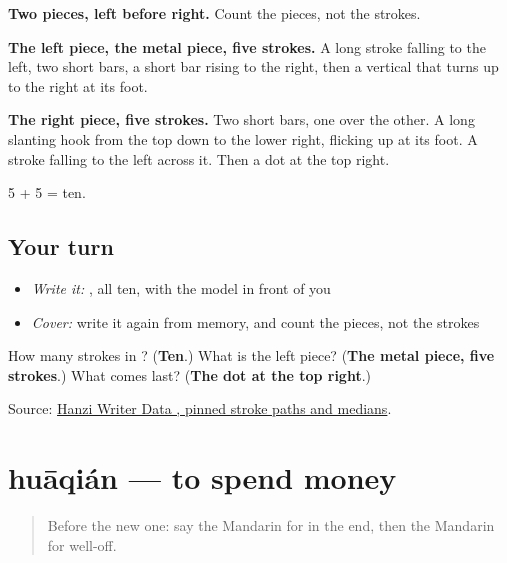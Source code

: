 \begin{quote}
\end{quote}

\textbf{Two pieces, left before right.} Count the pieces, not the strokes.

\textbf{The left piece, the metal piece, five strokes.} A long stroke falling to the left, two short bars, a short bar rising to the right, then a vertical that turns up to the right at its foot.

\textbf{The right piece, five strokes.} Two short bars, one over the other. A long slanting hook from the top down to the lower right, flicking up at its foot. A stroke falling to the left across it. Then a dot at the top right.

5 + 5 = ten.

\subsection*{Your turn}
\begin{itemize}
\raggedright
  \item \emph{Write it:} , all ten, with the model in front of you
  \item \emph{Cover:} write it again from memory, and count the pieces, not the strokes
\end{itemize}

\begin{tcolorbox}[breakable,colback=teal!4,colframe=teal!35!black,title={Before you move on}]
How many strokes in ? (\textbf{Ten}.) What is the left piece? (\textbf{The metal piece, five strokes}.) What comes last? (\textbf{The dot at the top right}.)

Source: \href{https://raw.githubusercontent.com/chanind/hanzi-writer-data/68d10a4b21150cae5e1ebbd223eed289cf32d90c/data/\%E9\%92\%B1.json}{Hanzi Writer Data , pinned stroke paths and medians}.
\end{tcolorbox}
\section[huāqián]{huāqián — to spend money}

\label{lesson:ZH-C188-huaqian}



\begin{quote}
Before the new one: say the Mandarin for in the end, then the Mandarin for well-off.
\end{quote}

